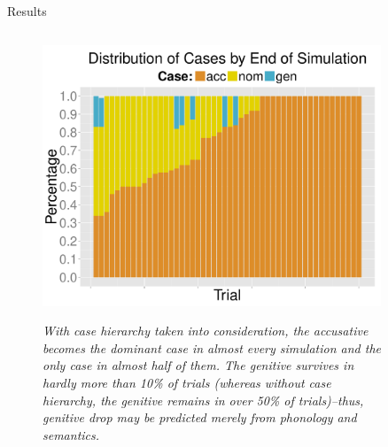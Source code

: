 \documentclass[final]{beamer}
\newlength{\sepwid}
\newlength{\onecolwid}
\newlength{\twocolwid}
\begin{document}
\begin{frame}[t]
\begin{columns}[t]
\begin{column}{\twocolwid}
\begin{block}{Results}
\begin{columns}[t]
      \begin{column}{.33\linewidth}
 	
    \begin{figure}
    \begin{center} 
	\vspace{2cm}
	{\centering \includegraphics[width=1\textwidth]{casedistribution.pdf}}
	\end{center}
	 \footnotesize
	\caption{\textit{With case hierarchy taken into consideration, the accusative becomes the dominant case in almost every simulation and the only case in almost half of them. The genitive survives in hardly more than 10\% of trials (whereas without case hierarchy, the genitive remains in over 50\% of trials)--thus, genitive drop may be predicted merely from phonology and semantics.}}
	\end{figure}
    \end{column}
    
\end{columns}

\end{block}


\end{column} %

\begin{column}{\sepwid}\end{column} %

\begin{column}{\onecolwid} %


\end{column}
\end{columns}
\end{frame}
\end{document}
